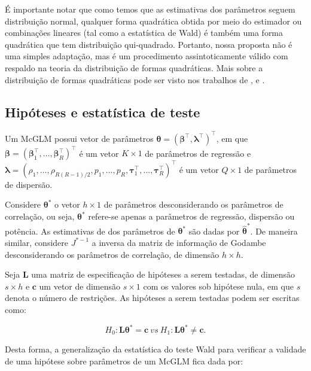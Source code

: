 \documentclass[AMA,STIX1COL]{WileyNJD-v2}
\begin{document}
É importante notar que como temos que as estimativas dos parâmetros seguem distribuição normal, qualquer forma quadrática obtida por meio do estimador ou combinações lineares (tal como a estatística de Wald) é também uma forma quadrática que tem distribuição qui-quadrado. Portanto, nossa proposta não é uma simples adaptação, mas é um procedimento assintoticamente válido com respaldo na teoria da distribuição de formas quadráticas. Mais sobre a distribuição de formas quadráticas pode ser visto nos trabalhos de \citet{graybill1957idempotent}, \citet{luther1965decomposition} e \citet{baldessari1967distribution}.

\subsection{Hipóteses e estatística de teste}

Um McGLM possui vetor de parâmetros $\boldsymbol{\theta} = (\boldsymbol{\beta}^{\top}, \boldsymbol{\lambda}^{\top})^{\top}$, em que $\boldsymbol{\beta} = (\boldsymbol{\beta}_1^\top, \ldots, \boldsymbol{\beta}_R^\top)^\top$ é um vetor $K \times 1$ de parâmetros de regressão e $\boldsymbol{\lambda} = (\rho_1, \ldots, \rho_{R(R-1)/2}, p_1, \ldots, p_R, \boldsymbol{\tau}_1^\top, \ldots, \boldsymbol{\tau}_R^\top)^\top$ é um vetor $Q \times 1$ de parâmetros de dispersão.

Considere $\boldsymbol{\theta^{*}}$ o vetor $h \times 1$ de parâmetros desconsiderando os parâmetros de correlação, ou seja, $\boldsymbol{\theta^{*}}$ refere-se apenas a parâmetros de regressão, dispersão ou potência. As estimativas de dos parâmetros de $\boldsymbol{\theta^{*}}$ são dadas por $\boldsymbol{\hat\theta^{*}}$. De maneira similar, considere $J^{\boldsymbol{*}-1}$ a inversa da matriz de informação de Godambe desconsiderando os parâmetros de correlação, de dimensão $h \times h$.

Seja $\boldsymbol{L}$ uma matriz de especificação de hipóteses a serem testadas, de dimensão $s \times h$ e $\boldsymbol{c}$ um vetor de dimensão $s \times 1$ com os valores sob hipótese nula, em que $s$ denota o número de restrições. As hipóteses a serem testadas podem ser escritas como:

\begin{equation}
\label{eq:hipoteses_wald}
H_0: \boldsymbol{L}\boldsymbol{\theta^{*}} = \boldsymbol{c} \ vs \ H_1: \boldsymbol{L}\boldsymbol{\theta^{*}} \neq \boldsymbol{c}. 
\end{equation}

\noindent Desta forma, a generalização da estatística do teste Wald para verificar a validade de uma hipótese sobre parâmetros de um McGLM fica dada por:
\end{document}
